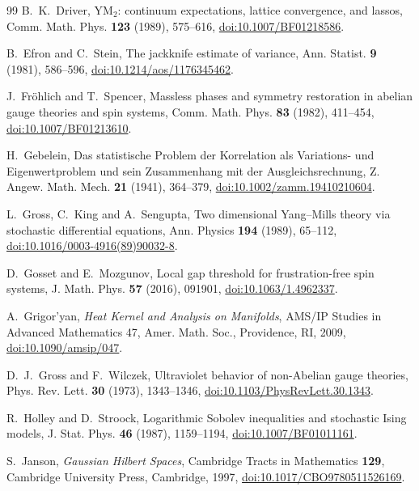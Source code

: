 \begin{thebibliography}{99}
B.~K.~Driver, YM$_2$: continuum expectations, lattice convergence, and lassos, Comm. Math. Phys. \textbf{123} (1989), 575--616, \href{https://doi.org/10.1007/BF01218586}{doi:10.1007/BF01218586}.

B.~Efron and C.~Stein, The jackknife estimate of variance, Ann. Statist. \textbf{9} (1981), 586--596, \href{https://doi.org/10.1214/aos/1176345462}{doi:10.1214/aos/1176345462}.

J.~Fr\"ohlich and T.~Spencer, Massless phases and symmetry restoration in abelian gauge theories and spin systems, Comm. Math. Phys. \textbf{83} (1982), 411--454, \href{https://doi.org/10.1007/BF01213610}{doi:10.1007/BF01213610}.

H.~Gebelein, Das statistische Problem der Korrelation als Variations- und Eigenwertproblem und sein Zusammenhang mit der Ausgleichsrechnung, Z. Angew. Math. Mech. \textbf{21} (1941), 364--379, \href{https://doi.org/10.1002/zamm.19410210604}{doi:10.1002/zamm.19410210604}.

L.~Gross, C.~King and A.~Sengupta, Two dimensional Yang--Mills theory via stochastic differential equations, Ann. Physics \textbf{194} (1989), 65--112, \href{https://doi.org/10.1016/0003-4916(89)90032-8}{doi:10.1016/0003-4916(89)90032-8}.

D.~Gosset and E.~Mozgunov, Local gap threshold for frustration-free spin systems, J. Math. Phys. \textbf{57} (2016), 091901, \href{https://doi.org/10.1063/1.4962337}{doi:10.1063/1.4962337}.

A.~Grigor'yan, \emph{Heat Kernel and Analysis on Manifolds}, AMS/IP Studies in Advanced Mathematics 47, Amer. Math. Soc., Providence, RI, 2009, \href{https://doi.org/10.1090/amsip/047}{doi:10.1090/amsip/047}.

D.~J.~Gross and F.~Wilczek, Ultraviolet behavior of non-Abelian gauge theories, Phys. Rev. Lett. \textbf{30} (1973), 1343--1346, \href{https://doi.org/10.1103/PhysRevLett.30.1343}{doi:10.1103/PhysRevLett.30.1343}.

R.~Holley and D.~Stroock, Logarithmic Sobolev inequalities and stochastic Ising models, J. Stat. Phys. \textbf{46} (1987), 1159--1194, \href{https://doi.org/10.1007/BF01011161}{doi:10.1007/BF01011161}.

S.~Janson, \emph{Gaussian Hilbert Spaces}, Cambridge Tracts in Mathematics
\textbf{129}, Cambridge University Press, Cambridge, 1997,
\href{https://doi.org/10.1017/CBO9780511526169}{doi:10.1017/CBO9780511526169}.


\end{thebibliography}
